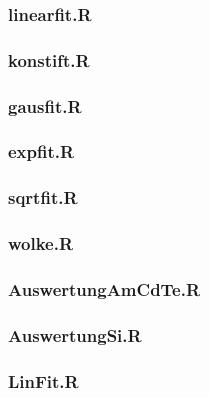 \documentclass[12pt]{article}
\begin{document}
\subsubsection{linearfit.R}\label{srclinearfit}

\subsubsection{konstift.R}\label{srckonstfit}

\subsubsection{gausfit.R}\label{srcgausfit}

\subsubsection{expfit.R}\label{srcexpfit}

\subsubsection{sqrtfit.R}\label{srcsqrtfit}

\subsubsection{wolke.R}\label{wolke}

\subsubsection{AuswertungAmCdTe.R}\label{AuswertungAmCdTe}

\subsubsection{AuswertungSi.R}\label{AuswertungSi}

\subsubsection{LinFit.R}\label{LinFit}

\end{document}
